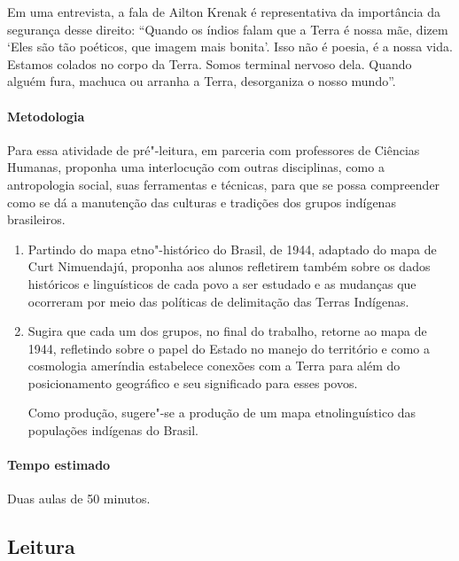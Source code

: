 \documentclass[12pt]{extarticle}
\begin{document}
Em uma entrevista, a fala de Ailton Krenak é representativa da importância da segurança desse direito:
``Quando os índios falam que a Terra é nossa mãe, dizem ‘Eles são tão poéticos, que imagem mais bonita’. 
Isso não é poesia, é a nossa vida. 
Estamos colados no corpo da Terra. 
Somos terminal nervoso dela. 
Quando alguém fura, machuca ou arranha a Terra, desorganiza o nosso mundo''. 

\paragraph{Metodologia}

Para essa atividade de pré"-leitura, em parceria com professores de Ciências Humanas, 
proponha uma interlocução com outras disciplinas, como a antropologia social, suas ferramentas 
e técnicas, para que se possa compreender como se dá a manutenção das culturas e tradições dos 
grupos indígenas brasileiros. 

\begin{enumerate}

\item Partindo do mapa etno"-histórico do Brasil, de 1944, adaptado do mapa de Curt Nimuendajú,
proponha aos alunos refletirem também sobre os dados históricos e linguísticos de cada povo
a ser estudado e as mudanças que ocorreram por meio das políticas de delimitação das Terras 
Indígenas. 

\item Sugira que cada um dos grupos, no final do trabalho, retorne ao mapa de 1944, refletindo 
sobre o papel do Estado no manejo do território e como a cosmologia ameríndia estabelece 
conexões com a Terra para além do posicionamento geográfico e seu significado para esses povos.

Como produção, sugere"-se a produção de um mapa etnolinguístico das populações indígenas do Brasil.
\end{enumerate}


\paragraph{Tempo estimado} Duas aulas de 50 minutos.


\subsection{Leitura}
\end{document}
